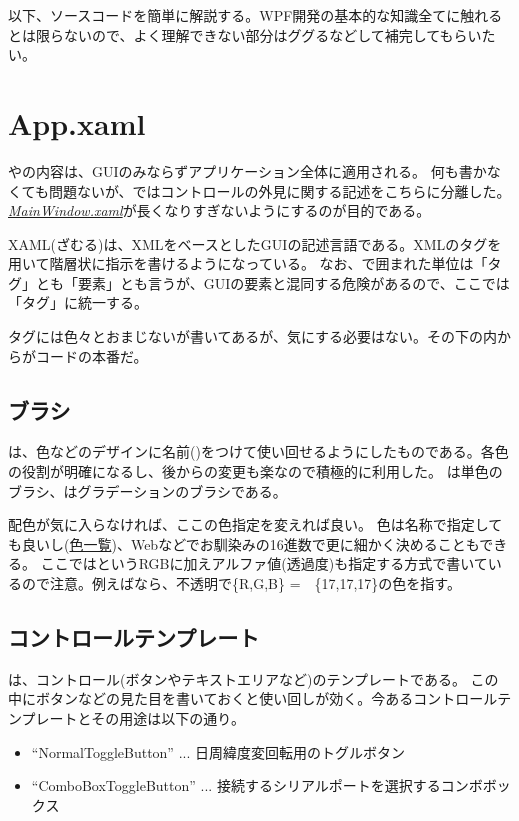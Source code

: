 \documentclass[letterpaper,10pt,dvipdfmx]{sphinxmanual}
\begin{document}
以下、ソースコードを簡単に解説する。WPF開発の基本的な知識全てに触れるとは限らないので、よく理解できない部分はググるなどして補完してもらいたい。


\section{App.xaml}
\label{\detokenize{nissyu-idohen/pc-software-code:app-xaml}}
やの内容は、GUIのみならずアプリケーション全体に適用される。
何も書かなくても問題ないが、ではコントロールの外見に関する記述をこちらに分離した。{\hyperref[\detokenize{nissyu-idohen/pc-software-code:mainwindow-xaml}]{\emph{MainWindow.xaml}}}が長くなりすぎないようにするのが目的である。

XAML(ざむる)は、XMLをベースとしたGUIの記述言語である。XMLのタグを用いて階層状に指示を書けるようになっている。
なお、\sphinxcode{\textless{}\textgreater{}}で囲まれた単位は「タグ」とも「要素」とも言うが、GUIの要素と混同する危険があるので、ここでは「タグ」に統一する。

タグには色々とおまじないが書いてあるが、気にする必要はない。その下の内からがコードの本番だ。


\subsection{ブラシ}
\label{\detokenize{nissyu-idohen/pc-software-code:id3}}
は、色などのデザインに名前()をつけて使い回せるようにしたものである。各色の役割が明確になるし、後からの変更も楽なので積極的に利用した。
は単色のブラシ、はグラデーションのブラシである。

配色が気に入らなければ、ここの色指定を変えれば良い。
色は名称で指定しても良いし(\href{http://www.atmarkit.co.jp/fdotnet/dotnettips/1071colorname/colorname.html\#colorsample}{色一覧})、Webなどでお馴染みの16進数で更に細かく決めることもできる。
ここではというRGBに加えアルファ値(透過度)も指定する方式で書いているので注意。例えばなら、不透明で\{R,G,B\}
=　\{17,17,17\}の色を指す。


\subsection{コントロールテンプレート}
\label{\detokenize{nissyu-idohen/pc-software-code:id4}}
は、コントロール(ボタンやテキストエリアなど)のテンプレートである。
この中にボタンなどの見た目を書いておくと使い回しが効く。今あるコントロールテンプレートとその用途は以下の通り。
\begin{itemize}
\item {} 
``NormalToggleButton'' ... 日周緯度変回転用のトグルボタン

\item {} 
``ComboBoxToggleButton'' ...
接続するシリアルポートを選択するコンボボックス

\end{itemize}
\end{document}
